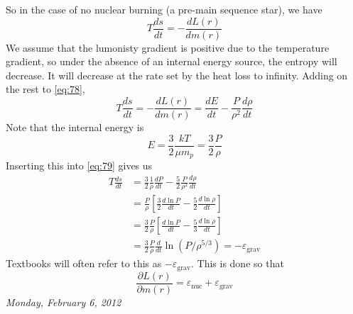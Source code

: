 \documentclass[10pt]{article}
\numberwithin{equation}{section}
\begin{document}
  So in the case of no nuclear burning (a pre-main sequence star), we
  have
  \begin{equation}
    \label{eq:78}
    T\frac{ds}{dt}=-\frac{d L(r)}{dm(r)}
  \end{equation}
  We assume that the lumonisty gradient is positive due to the
  temperature gradient, so under the absence of an internal energy
  source, the entropy will decrease. It will decrease at the rate set
  by the heat loss to infinity. Adding on the rest to \eqref{eq:78},
  \begin{equation}
    \label{eq:79}
    T\frac{ds}{dt}=-\frac{d L(r)}{dm(r)}=\frac{dE}{dt}-\frac{P}
{\rho^2}\frac{d\rho}{dt}
  \end{equation}
  Note that the internal energy is
  \begin{equation}
    \label{eq:79a}
    E=\frac{3}{2}\frac{kT}{\mu m_p}=\frac{3}{2}\frac{P}{\rho}
  \end{equation}
  Inserting this into \eqref{eq:79} gives us
  \begin{align}
    \label{eq:5}
    T\frac{ds}{dt} &=
    \frac{3}{2}\frac{1}{\rho}\frac{dP}{dt}-\frac{5}{2}\frac{P}{\rho^2}\frac
{d\rho}{dt}\\
    \label{eq:5a}
    &= \frac{P}{\rho}\left[\frac{3}{2}\frac{d\ln
        P}{dt}-\frac{5}{2}\frac{d\ln \rho}{dt}\right]\\
    \label{eq:5b}
    &= \frac{3}{2}\frac{P}{\rho}\left[\frac{d\ln
        P}{dt}-\frac{5}{3}\frac{d\ln\rho}{dt}\right]\\
    \label{eq:5c}
    &=\frac{3}{2}\frac{P}{\rho}\frac{d}{dt}\ln \left(
      P/\rho^{5/3}\right)=-\varepsilon_{\mathrm{grav}}
  \end{align}
  Textbooks will often refer to this as
  $-\varepsilon_{\mathrm{grav}}$. This is done so that
  \begin{equation}
    \label{eq:6}
    \frac{\partial L(r)}{\partial
      m(r)}=\varepsilon_{\mathrm{nuc}}+\varepsilon_{\mathrm{grav}}
  \end{equation}
  \textit{Monday, February 6, 2012}\\
\end{document}
